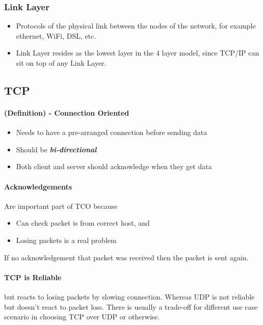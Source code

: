\documentclass[10pt]{article}
\begin{document}
\subsubsection{Link Layer}
\begin{itemize}
    \item Protocols of the physical link between the nodes of the network, for example ethernet, WiFi, DSL, etc.
    \item Link Layer resides as the lowest layer in the 4 layer model, since TCP/IP can sit on top of any Link Layer. 
\end{itemize}

\subsection{TCP}
\paragraph{(Definition) - Connection Oriented}
\begin{itemize}
    \item Needs to have a pre-arranged connection before sending data
    \item Should be \textbf{\textit{bi-directional}}
    \item Both client and server should acknowledge when they get data    
\end{itemize}

\paragraph{Acknowledgements} Are important part of TCO because
\begin{itemize}
    \item Can check packet is from correct host, and
    \item Losing packets is a real problem
\end{itemize}
If no acknowledgement that packet was received then the packet is sent again.

\paragraph{TCP is Reliable} but reacts to losing packets by slowing connection. Whereas UDP is not reliable but doesn't react to packet loss. There is usually a trade-off for different use case scenario in choosing TCP over UDP or otherwise. 
\end{document}
